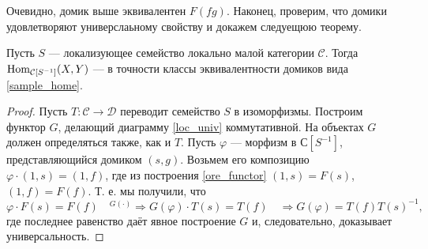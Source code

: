 \documentclass[../hw_main.tex]{subfiles}
\begin{document}
Очевидно, домик выше эквивалентен $F(fg)$. Наконец, проверим, что домики удовлетворяют универслаьному свойству и докажем следуещюю теорему.
\begin{to_thr}
 Пусть $S$ --- локализующее семейство локально малой категории $\mathcal{C}$. Тогда $\operatorname{Hom}_{\mathcal{C}[S^{-1}]}(X, Y)$ --- в точности классы эквивалентности домиков вида \eqref{sample_home}.
 \label{ore_loc_desc}
 \end{to_thr}
 \begin{proof}
 Пусть $T:\mathcal{C}\to \mathcal{D}$ переводит семейство $S$ в изоморфизмы. Построим функтор $G$, делающий диаграмму \ref{loc_univ} коммутативной.
На объектах $G$ должен определяться также, как и $T$. Пусть $\varphi$ --- морфизм в $\mathcal{С}[S^{-1}]$, представляющийся домиком $(s, g)$.  Возьмем его композицию $\varphi\cdot (1, s) = (1, f)$, где из построения \eqref{ore_functor} $(1, s) = F(s)$, $(1, f) = F(f)$. Т. е. мы получили, что
\begin{equation*}
	\varphi\cdot F(s) = F(f)\quad {}^{G(\cdot)}
	 \Rightarrow G(\varphi)\cdot T(s) = T(f)\quad
	 \Rightarrow G(\varphi) = T(f)T(s)^{-1},
      \end{equation*}
где последнее равенство даёт явное построение $G$ и, следовательно, доказывает универсальность.
\end{proof}
\end{document}

